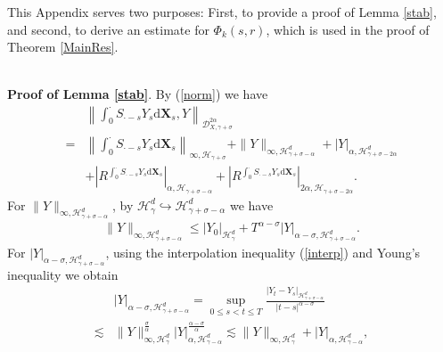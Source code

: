 \documentclass[10pt,a4paper]{article}
\renewcommand{\theequation}{\arabic{section}.\arabic{equation}}
\numberwithin{equation}{section}
\renewcommand{\theequation}{\arabic{section}.\arabic{equation}}
\begin{document}
\appendix
\renewcommand{\thelemma}{A.\arabic{lemma}} %
\setcounter{lemma}{0}
\renewcommand{\theequation}{A.\arabic{equation}} %
\setcounter{equation}{0} %



This Appendix serves two purposes: First, to provide a proof of Lemma \ref{stab}, and second, to derive an estimate for $\Phi_k(s,r)$, which is used in the proof of Theorem \ref{MainRes}.


~~~~~~~~~~~~~~~~~~~~\\
\textbf{Proof of Lemma \ref{stab}}.	
By (\ref{norm}) we have
\begin{align*}
	&\left\|\int_0^\cdot S_{\cdot-s} Y_s \mathrm{d} \mathbf X_s, Y \right\|_{\mathcal{D}_{X,\gamma+\sigma}^{2\alpha}} \nonumber\\
	=&\left\|\int_0^\cdot S_{\cdot-s} Y_s \mathrm{d} \mathbf X_s \right\|_{\infty, \mathcal{H}_{\gamma+\sigma}}+\|Y\|_{\infty,\mathcal H_{\gamma+\sigma-\alpha}^{d}}
	+|Y|_{\alpha,\mathcal H_{\gamma+\sigma-2\alpha}^{d}} \nonumber\\
	&+ \left|R^{\int_0^\cdot S_{\cdot-s} Y_s \mathrm{d} \mathbf X_s} \right|_{\alpha,\mathcal H_{\gamma+\sigma-\alpha}}
	+\left|R^{\int_0^\cdot S_{\cdot-s} Y_s \mathrm{d} \mathbf X_s} \right|_{2\alpha,\mathcal H_{\gamma+\sigma-2\alpha}} .
\end{align*}
For $\|Y\|_{\infty,\mathcal H_{\gamma+\sigma-\alpha}^{d}}$, by  $\mathcal H_{\gamma}^{d} \hookrightarrow \mathcal H_{\gamma+\sigma-\alpha}^{d} $ we have
\begin{align}\label{Ysup}
	\|Y\|_{\infty,\mathcal H_{\gamma+\sigma-\alpha}^{d}}
	\leq |Y_0|_{\mathcal H_\gamma^d}+T^{\alpha-\sigma} |Y|_{\alpha-\sigma,\mathcal H_{\gamma+\sigma-\alpha}^{d}}.
\end{align}
For $|Y|_{\alpha-\sigma,\mathcal H_{\gamma+\sigma-\alpha}^{d}}$,
using the interpolation inequality (\ref{interp}) and Young's inequality we obtain
\begin{align}\label{Galpsig}
	&|Y|_{\alpha-\sigma,\mathcal H_{\gamma+\sigma-\alpha}^{d}}
	=\sup_{0\leq s<t \leq T}  \frac{\left|Y_t-Y_s \right|_{\mathcal H_{\gamma+\sigma-\alpha}^{d} }}{|t-s|^{\alpha-\sigma}} \nonumber\\
	\lesssim &  \|Y\|_{\infty, \mathcal H_{\gamma}^{d}}^{\frac \sigma \alpha} |Y|_{\alpha, \mathcal H_{\gamma-\alpha}^{d}}^{\frac {\alpha-\sigma} \alpha}
	\lesssim  \|Y\|_{\infty, \mathcal H_{\gamma}^{d}}+|Y|_{\alpha, \mathcal H_{\gamma-\alpha}^{d}},
\end{align}
\end{document}
